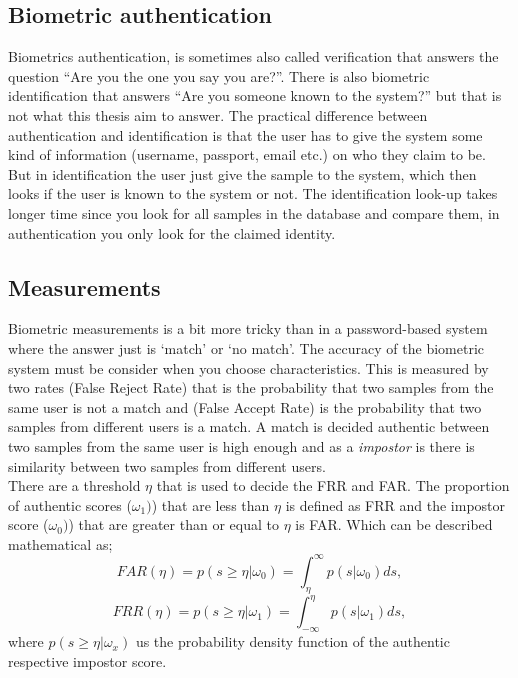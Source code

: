 \subsection{Biometric authentication}
Biometrics authentication, is sometimes also called verification that answers the question ``Are you the one you say you are?''. There is also biometric identification that answers ``Are you someone known to the system?'' but that is not what this thesis aim to answer. The practical difference between authentication and identification is that the user has to give the system some kind of information (username, passport, email etc.) on who they claim to be. But in identification the user just give the sample to the system, which then looks if the user is known to the system or not. The identification look-up takes longer time since you look for all samples in the database and compare them, in authentication you only look for the claimed identity. \cite[ch.~1]{introbio}

\subsection{Measurements}
Biometric measurements is a bit more tricky than in a password-based system where the answer just is `match' or `no match'. The accuracy of the biometric system must be consider when you choose characteristics. This is measured by two rates  (False Reject Rate) that is the probability that two samples from the same user is not a match and  (False Accept Rate) is the probability that two samples from different users is a match. A match is decided authentic between two samples from the same user is high enough and as a \textit{impostor} is there is similarity between two samples from different users.  \\
There are a threshold $\eta$ that is used to decide the FRR and FAR. The proportion of authentic scores ($\omega_{1})$) that are less than $\eta$ is defined as FRR and the impostor score ($\omega_{0})$) that are greater than or equal to $\eta$ is FAR. Which can be described mathematical as; 
$$ FAR(\eta) = p(s\geq \eta | \omega_{0}) = \int_{\eta}^{\infty} p(s | \omega_{0}) ds, $$
$$ FRR(\eta) = p(s\geq \eta | \omega_{1}) = \int_{-\infty}^{\eta} p(s | \omega_{1}) ds, $$
where $p(s\geq \eta | \omega_{x})$ us the probability density function of the authentic respective impostor score. 
\cite[p.~18]{introbio}

